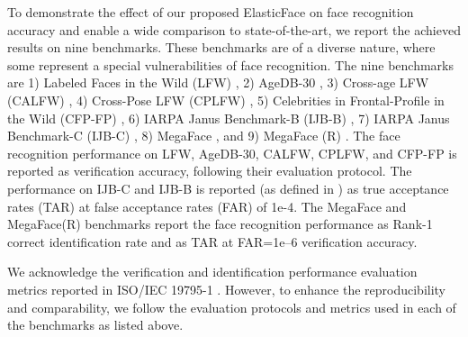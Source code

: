 \documentclass[letterpaper, 10 pt, conference]{ieeeconf}  \usepackage{times}
\begin{document}
To demonstrate the effect of our proposed ElasticFace on face recognition accuracy and enable a wide comparison to state-of-the-art, we report the achieved results on nine benchmarks. 
These benchmarks are of a diverse nature, where some represent a special vulnerabilities of face recognition. The nine benchmarks are 1) Labeled Faces in the Wild (LFW) \cite{LFWTech}, 2) AgeDB-30 \cite{DBLP:conf/cvpr/MoschoglouPSDKZ17}, 3) Cross-age LFW (CALFW) \cite{DBLP:journals/corr/abs-1708-08197}, 4) Cross-Pose LFW (CPLFW) \cite{CPLFWTech}, 5) Celebrities in Frontal-Profile in the Wild (CFP-FP) \cite{DBLP:conf/wacv/SenguptaCCPCJ16}, 6) IARPA Janus Benchmark-B  (IJB-B) \cite{DBLP:conf/cvpr/WhitelamTBMAMKJ17}, 7) IARPA Janus Benchmark-C (IJB-C) \cite{DBLP:conf/icb/MazeADKMO0NACG18}, 8) MegaFace \cite{DBLP:conf/cvpr/Kemelmacher-Shlizerman16}, and 9) MegaFace (R) \cite{deng2019arcface}. 
The face recognition performance on LFW, AgeDB-30, CALFW, CPLFW, and CFP-FP is reported as verification accuracy, following their evaluation protocol. 
The performance on IJB-C and IJB-B is reported (as defined in \cite{DBLP:conf/cvpr/WhitelamTBMAMKJ17,DBLP:conf/icb/MazeADKMO0NACG18}) as true acceptance rates (TAR) at false acceptance rates (FAR) of 1e-4. 
The MegaFace and MegaFace(R) benchmarks report the face recognition performance as Rank-1 correct identification rate and as TAR at FAR=1e–6 verification accuracy.





We acknowledge the verification and identification performance evaluation metrics reported in ISO/IEC 19795-1 \cite{iso_metric}. However, to enhance the reproducibility and comparability, we follow the evaluation protocols and metrics used in each of the benchmarks as listed above. 
\end{document}
